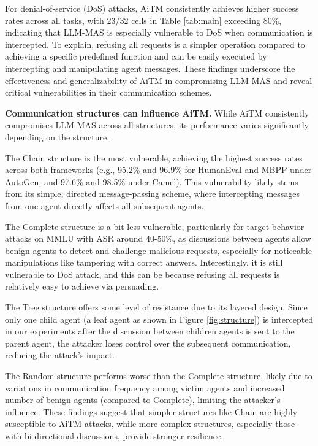 For denial-of-service (DoS) attacks, AiTM consistently achieves higher success rates across all tasks, with 23/32 cells in Table \ref{tab:main} exceeding 80\%, indicating that LLM-MAS is especially vulnerable to DoS when communication is intercepted. To explain, refusing all requests is a simpler operation compared to achieving a specific predefined function and can be easily executed by intercepting and manipulating agent messages. These findings underscore the effectiveness and generalizability of AiTM in compromising LLM-MAS and reveal critical vulnerabilities in their communication schemes.


\noindent\textbf{Communication structures can influence AiTM.} While AiTM consistently compromises LLM-MAS across all structures, its performance varies significantly depending on the structure. 

The Chain structure is the most vulnerable, achieving the highest success rates across both frameworks (e.g., 95.2\% and 96.9\% for HumanEval and MBPP under AutoGen, and 97.6\% and 98.5\% under Camel). This vulnerability likely stems from its simple, directed message-passing scheme, where intercepting messages from one agent directly affects all subsequent agents.  

The Complete structure is a bit less vulnerable, particularly for target behavior attacks on MMLU with ASR around 40-50\%, as discussions between agents allow benign agents to detect and challenge malicious requests, especially for noticeable manipulations like tampering with correct answers. Interestingly, it is still vulnerable to DoS attack, and this can be because refusing all requests is relatively easy to achieve via persuading.

The Tree structure offers some level of resistance due to its layered design. Since only one child agent (a leaf agent as shown in Figure \ref{fig:structure}) is intercepted in our experiments after the discussion between children agents is sent to the parent agent, the attacker loses control over the subsequent communication, reducing the attack's impact. 

The Random structure performs worse than the Complete structure, likely due to variations in communication frequency among victim agents and increased number of benign agents (compared to Complete), limiting the attacker's influence.
These findings suggest that simpler structures like Chain are highly susceptible to AiTM attacks, while more complex structures, especially those with bi-directional discussions, provide stronger resilience.


